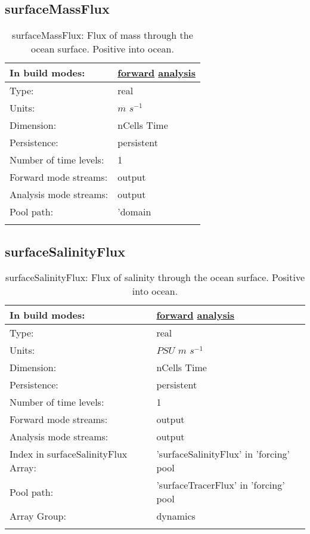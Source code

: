\subsection[surfaceMassFlux]{surfaceMassFlux}
\label{subsec:var_sec_forcing_surfaceMassFlux}
\begin{center}
\begin{longtable}{| p{2.0in} | p{4.0in} |}
        \hline 
        In build modes: & \hyperref[subsec:forward_var_tab_forcing]{forward} \hyperref[subsec:analysis_var_tab_forcing]{analysis} \\
        \hline 
        Type: & real \\
        \hline 
        Units: & $m$ $s^{-1}$ \\
        \hline 
        Dimension: & nCells Time \\
        \hline 
        Persistence: & persistent \\
        \hline 
        Number of time levels: & 1 \\
        \hline 
		 Forward mode streams: &  output \\
        \hline 
		 Analysis mode streams: &  output \\
        \hline 
            Pool path: & 'domain %
 \\
		 \hline 
    \caption{surfaceMassFlux: Flux of mass through the ocean surface. Positive into ocean.}
\end{longtable}
\end{center}
\subsection[surfaceSalinityFlux]{surfaceSalinityFlux}
\label{subsec:var_sec_forcing_surfaceSalinityFlux}
\begin{center}
\begin{longtable}{| p{2.0in} | p{4.0in} |}
        \hline 
        In build modes: & \hyperref[subsec:forward_var_tab_forcing]{forward} \hyperref[subsec:analysis_var_tab_forcing]{analysis} \\
        \hline 
        Type: & real \\
        \hline 
        Units: & $PSU$ $m$ $s^{-1}$ \\
        \hline 
        Dimension: & nCells Time \\
        \hline 
        Persistence: & persistent \\
        \hline 
        Number of time levels: & 1 \\
        \hline 
		 Forward mode streams: &  output \\
        \hline 
		 Analysis mode streams: &  output \\
        \hline 
		 Index in surfaceSalinityFlux Array: & 'surfaceSalinityFlux' in 'forcing' pool \\
		 \hline 
            Pool path: & 'surfaceTracerFlux' in 'forcing' pool
 \\
		 \hline 
		 Array Group: & dynamics \\
		 \hline 
    \caption{surfaceSalinityFlux: Flux of salinity through the ocean surface. Positive into ocean.}
\end{longtable}
\end{center}
